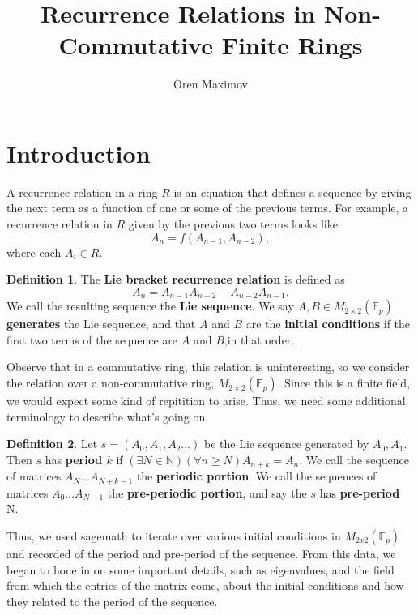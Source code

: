 \documentclass[12pt, letterpaper]{article}
\title{Recurrence Relations in Non-Commutative Finite Rings}
\author{Oren Maximov}
\theoremstyle{definition}
\newtheorem{definition}{Definition}[section]
\newcommand{\M}{M_{2\times 2}(\mathbb{F}_p)}
\begin{document}
\maketitle
\section{Introduction}


A recurrence relation in a ring $R$ is an equation that defines a sequence by giving the next term as a function of one or some of the previous terms. For example, a recurrence relation in $R$ given by the previous two terms looks like \[A_n = f(A_{n-1},A_{n-2}),\] where each $A_i \in R$.


\begin{definition}
The \textbf{Lie bracket recurrence relation} is defined as \[A_n = A_{n-1}A_{n-2}-A_{n-2}A_{n-1}.\] We call the resulting sequence the \textbf{Lie sequence}. We say $A,B \in \M$ \textbf{generates} the Lie sequence, and that $A$ and $B$ are the \textbf{initial conditions} if the first two terms of the sequence are $A$ and $B$,in that order.
\end{definition}
\par Observe that in a commutative ring, this relation is uninteresting, so we consider the relation over a non-commutative ring, $\M$. Since this is a finite field, we would expect some kind of repitition to arise. Thus, we need some additional terminology to describe what's going on.
\begin{definition}
Let $s = (A_0,A_1,A_2\dots)$ be the Lie sequence generated by $A_0,A_1$. Then $s$ has \textbf{period $k$} if $(\exists N \in \mathbb{N})(\forall n\geq N) A_{n+k} = A_n$. We call the sequence of  matrices $A_N \dots A_{N+k-1}$ the \textbf{periodic portion}. We call the sequences of matrices $A_0 \dots A_{N-1}$ the \textbf{pre-periodic portion}, and say the $s$ has \textbf{pre-period} N.
\end{definition}

\par  Thus, we used sagemath to iterate over various initial conditions in $M_{2x2}(\mathbb{F}_p)$ and recorded of the period and pre-period of the sequence. From this data, we began to hone in on some important details, such as eigenvalues, and the field from which the entries of the matrix come, about the initial conditions and how they related to the period of the sequence.
\end{document}
